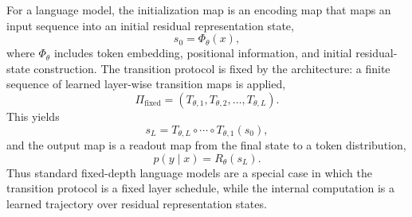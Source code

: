 \documentclass{article}
\begin{document}
For a language model, the initialization map is an encoding map that maps an input sequence into an initial residual representation state,
\begin{equation}
    s_0=\Phi_\theta(x),
    \label{eq:intro_input_initialization}
\end{equation}
where $\Phi_\theta$ includes token embedding, positional information, and initial residual-state construction. The transition protocol is fixed by the architecture: a finite sequence of learned layer-wise transition maps is applied,
\begin{equation}
    \Pi_{\mathrm{fixed}}=(T_{\theta,1},T_{\theta,2},\ldots,T_{\theta,L}).
    \label{eq:intro_lm_fixed_protocol}
\end{equation}
This yields
\begin{equation}
    s_L=T_{\theta,L}\circ\cdots\circ T_{\theta,1}(s_0),
    \label{eq:intro_lm_state_trajectory}
\end{equation}
and the output map is a readout map from the final state to a token distribution,
\begin{equation}
    p(y\mid x)=R_\theta(s_L).
    \label{eq:intro_lm_readout}
\end{equation}
Thus standard fixed-depth language models are a special case in which the transition protocol is a fixed layer schedule, while the internal computation is a learned trajectory over residual representation states.
\end{document}
